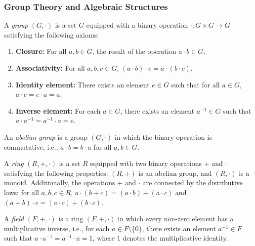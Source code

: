 \documentclass{iacrtrans}
\begin{document}
\subsubsection{Group Theory and Algebraic Structures}

\begin{definition}[Group]
	A \textit{group} $(G, \cdot)$ is a set $G$ equipped with a binary operation $\cdot : G \times G \to G$ satisfying the following axioms:
	\begin{enumerate}
		\item \textbf{Closure:} For all $a, b \in G$, the result of the operation $a \cdot b \in G$.
		\item \textbf{Associativity:} For all $a, b, c \in G$, $(a \cdot b) \cdot c = a \cdot (b \cdot c)$.
		\item \textbf{Identity element:} There exists an element $e \in G$ such that for all $a \in G$, $a \cdot e = e \cdot a = a$.
		\item \textbf{Inverse element:} For each $a \in G$, there exists an element $a^{-1} \in G$ such that $a \cdot a^{-1} = a^{-1} \cdot a = e$.
	\end{enumerate}
\end{definition}

\begin{definition}
	An \textit{abelian group} is a group $(G, \cdot)$ in which the binary operation is commutative, i.e., $a \cdot b = b \cdot a$ for all $a, b \in G$.
\end{definition}

\begin{definition}[Ring]
	A \textit{ring} $(R, +, \cdot)$ is a set $R$ equipped with two binary operations $+$ and $\cdot$ satisfying the following properties: $(R, +)$ is an abelian group, and $(R, \cdot)$ is a monoid. Additionally, the operations $+$ and $\cdot$ are connected by the distributive laws: for all $a, b, c \in R$, $a \cdot (b + c) = (a \cdot b) + (a \cdot c)$ and $(a + b) \cdot c = (a \cdot c) + (b \cdot c)$.
\end{definition}

\begin{definition}[Field]
	A \textit{field} $(F, +, \cdot)$ is a ring $(F, +, \cdot)$ in which every non-zero element has a multiplicative inverse, i.e., for each $a \in F \setminus \{0\}$, there exists an element $a^{-1} \in F$ such that $a \cdot a^{-1} = a^{-1} \cdot a = 1$, where $1$ denotes the multiplicative identity.
\end{definition}
\end{document}
